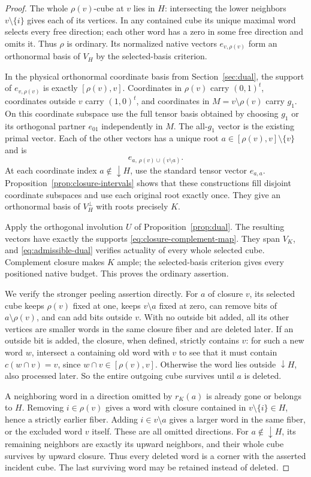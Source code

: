 \documentclass[11pt]{article}
\theoremstyle{definition}
\begin{document}
\begin{proof}
The whole $\rho(v)$-cube at $v$ lies in $H$: intersecting the lower
neighbors $v\setminus\{i\}$ gives each of its vertices. In any contained
cube its unique maximal word selects every free direction; each other
word has a zero in some free direction and omits it. Thus $\rho$ is
ordinary. Its normalized native vectors $e_{v,\rho(v)}$ form an
orthonormal basis of $V_H$ by the selected-basis criterion.

In the physical orthonormal coordinate basis from Section~\ref{sec:dual},
the support of $e_{v,\rho(v)}$ is exactly $[\rho(v),v]$.
Coordinates in $\rho(v)$ carry $(0,1)^t$, coordinates outside $v$ carry
$(1,0)^t$, and coordinates in $M=v\setminus\rho(v)$ carry $g_1$.
On this coordinate subspace use the full tensor basis obtained by choosing
$g_1$ or its orthogonal partner $e_{01}$ independently in $M$.
The all-$g_1$ vector is the existing primal vector. Each of the other
vectors has a unique root $a\in[\rho(v),v]\setminus\{v\}$ and is
\[
 e_{a,\,\rho(v)\cup(v\setminus a)}.
\]
At each coordinate index $a\notin\downarrow H$, use the standard tensor
vector $e_{a,a}$. Proposition~\ref{prop:closure-intervals} shows that
these constructions fill disjoint coordinate subspaces and use each
original root exactly once. They give an orthonormal basis of $V_H^\perp$
with roots precisely $K$.

Apply the orthogonal involution $U$ of Proposition~\ref{prop:dual}.
The resulting vectors have exactly the supports
\eqref{eq:closure-complement-map}. They span $V_K$, and
\eqref{eq:admissible-dual} verifies actuality of every whole selected cube.
Complement closure makes $K$ ample; the selected-basis criterion gives
every positioned native budget. This proves the ordinary assertion.

We verify the stronger peeling assertion directly. For $a$ of closure
$v$, its selected cube keeps $\rho(v)$ fixed at one, keeps
$v\setminus a$ fixed at zero, can remove bits of
$a\setminus\rho(v)$, and can add bits outside $v$.
With no outside bit added, all its other vertices are smaller words in
the same closure fiber and are deleted later. If an outside bit is added,
the closure, when defined, strictly contains $v$: for such a new word $w$,
intersect a containing old word with $v$ to see that it must contain
$c(w\cap v)=v$, since $w\cap v\in[\rho(v),v]$.
Otherwise the word lies outside $\downarrow H$, also processed later.
So the entire outgoing cube survives until $a$ is deleted.

A neighboring word in a direction omitted by $r_K(a)$ is already gone
or belongs to $H$. Removing $i\in\rho(v)$ gives a word with closure
contained in $v\setminus\{i\}\in H$, hence a strictly earlier fiber.
Adding $i\in v\setminus a$ gives a larger word in the same fiber,
or the excluded word $v$ itself. These are all omitted directions.
For $a\notin\downarrow H$, its remaining neighbors are exactly its
upward neighbors, and their whole cube survives by upward closure.
Thus every deleted word is a corner with the asserted incident cube.
The last surviving word may be retained instead of deleted.


\end{proof}
\end{document}
